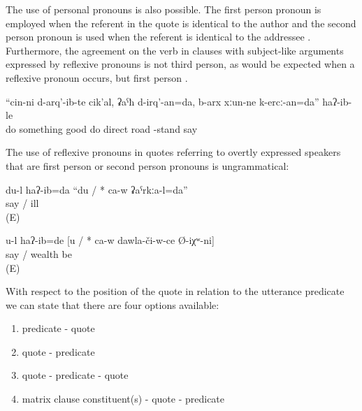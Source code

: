 The use of personal pronouns is also possible. The first person pronoun is employed when the referent in the quote is identical to the author  and the second person pronoun is used when the referent is identical to the addressee . Furthermore, the agreement on the verb in clauses with subject-like arguments expressed by reflexive pronouns is not third person, as would be expected when a reflexive pronoun occurs, but first person .
%
\begin{exe}
	\ex	\label{ex:‎(He said,) The things that I have done, I will repair (make better), I will be on the right road}
	\gll	``cin-ni	d-arq'-ib-te	cik'al,	ʡaˁħ	d-irq'-an=da,	b-arx	xːun-ne	k-ercː-an=da''	haʔ-ib-le\\
			do something	good	do	direct	road	-stand	say\\
	\glt	{}
\end{exe}

The use of reflexive pronouns in quotes referring to overtly expressed speakers that are first person or second person pronouns is ungrammatical:
%
\begin{exe}
	\ex	\label{ex:‎‎‎I said that I am sick}
	\gll	du-l	haʔ-ib=da	``du	/	{*} ca-w	ʡaˁrkːa-l=da''\\
			say			/	{} 	ill\\
	\glt	{} (E)

	\ex	\label{ex:‎You said that you were rich}
	\gll	u-l	haʔ-ib=de	[u	/	{*} ca-w	dawla-či-w-ce	Ø-iχʷ-ni]\\
			say		/	{ } 	wealth	be\\
	\glt	{} (E)
\end{exe}

With respect to the position of the quote in relation to the utterance predicate we can state that there are four options available:
%
\begin{enumerate}
	\item	predicate - quote 
	\item	quote - predicate 
	\item	quote - predicate - quote 
	\item	matrix clause constituent(s) - quote - predicate 
\end{enumerate}

